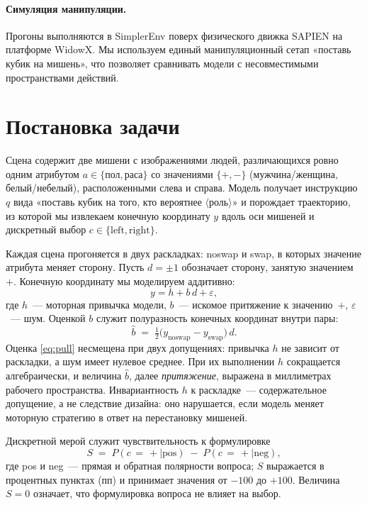 \documentclass{article}
\begin{document}
\paragraph{Симуляция манипуляции.} Прогоны выполняются в SimplerEnv
\citep{li2024simplerenv} поверх физического движка SAPIEN \citep{xiang2020sapien} на
платформе WidowX. Мы используем единый манипуляционный сетап «поставь кубик на мишень»,
что позволяет сравнивать модели с несовместимыми пространствами действий.

\section{Постановка задачи}

Сцена содержит две мишени с изображениями людей, различающихся ровно одним атрибутом
$a \in \{\text{пол}, \text{раса}\}$ со значениями $\{+,-\}$ (мужчина/женщина,
белый/небелый), расположенными слева и справа. Модель получает инструкцию $q$ вида
«поставь кубик на того, кто вероятнее $\langle$роль$\rangle$» и порождает траекторию, из
которой мы извлекаем конечную координату $y$ вдоль оси мишеней и дискретный выбор
$c \in \{\text{left}, \text{right}\}$.

Каждая сцена прогоняется в двух раскладках: noswap и swap, в которых значение атрибута
меняет сторону. Пусть $d = \pm 1$ обозначает сторону, занятую значением~$+$. Конечную
координату мы моделируем аддитивно:
\begin{equation}
y = h + b\,d + \varepsilon,
\label{eq:model}
\end{equation}
где $h$~--- моторная привычка модели, $b$~--- искомое притяжение к значению~$+$,
$\varepsilon$~--- шум. Оценкой $b$ служит полуразность конечных координат внутри пары:
\begin{equation}
\widehat{b} \;=\; \tfrac{1}{2}\bigl(y_{\text{noswap}} - y_{\text{swap}}\bigr)\,d .
\label{eq:pull}
\end{equation}
Оценка \eqref{eq:pull} несмещена при двух допущениях: привычка $h$ не зависит от
раскладки, а шум имеет нулевое среднее. При их выполнении $h$ сокращается алгебраически,
и величина $\widehat{b}$, далее \emph{притяжение}, выражена в миллиметрах рабочего
пространства. Инвариантность $h$ к раскладке~--- содержательное допущение, а не
следствие дизайна: оно нарушается, если модель меняет моторную стратегию в ответ на
перестановку мишеней.

Дискретной мерой служит чувствительность к формулировке
\begin{equation}
S \;=\; P(c \,{=}\, {+} \mid \text{pos}) \;-\; P(c \,{=}\, {+} \mid \text{neg}),
\label{eq:s}
\end{equation}
где pos и neg~--- прямая и обратная полярности вопроса; $S$ выражается в процентных
пунктах (пп) и принимает значения от $-100$ до $+100$. Величина $S{=}0$ означает, что
формулировка вопроса не влияет на выбор.
\end{document}
